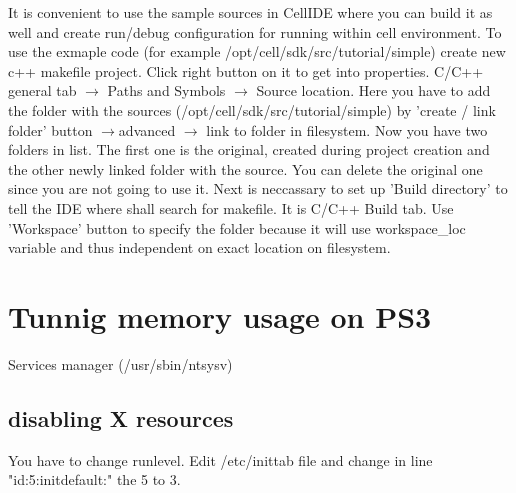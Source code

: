 It is convenient to use the sample sources in CellIDE where you can build it as well and create run/debug configuration for running within cell environment. To use the exmaple code (for example /opt/cell/sdk/src/tutorial/simple) create new c++ makefile project. Click right button on it to get into properties. C/C++ general tab $\rightarrow$ Paths and Symbols $\rightarrow$ Source location. Here you have to add the folder with the sources (/opt/cell/sdk/src/tutorial/simple) by 'create / link folder' button $\rightarrow$advanced $\rightarrow$ link to folder in filesystem. Now you have two folders in list. The first one is the original, created during project creation and the other newly linked folder with the source. You can delete the original one since you are not going to use it.
Next is neccassary to set up 'Build directory' to tell the IDE where shall search for makefile. It is C/C++ Build tab. Use 'Workspace' button to specify the folder because it will use workspace\_loc variable and thus independent on exact location on filesystem.  

\section{Tunnig memory usage on PS3}

Services manager (/usr/sbin/ntsysv)

\subsection{disabling X resources}

You have to change runlevel. Edit /etc/inittab file and change in line "id:5:initdefault:" the 5 to 3.